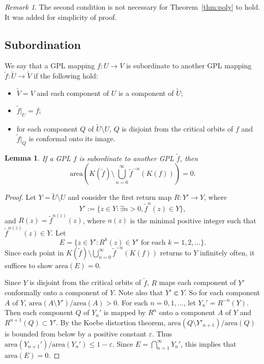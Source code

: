 \documentclass{amsart}
\numberwithin{equation}{section}
\newtheorem{lemma}[theorem]{Lemma}%
\theoremstyle{definition}
\theoremstyle{remark}
\newtheorem{remark}[theorem]{Remark}%
\begin{document}
\begin{remark} The second condition is not necessary for Theorem~\ref{thm:poly} to hold. It was added for simplicity of proof. 
\end{remark}




\subsection{Subordination}\label{subsec:subord}
We say that a GPL mapping $f:U\to V$ is subordinate to another GPL mapping $\widetilde{f}:\widetilde{U}\to \widetilde{V}$ if the following hold:
\begin{itemize}
\item $\widetilde{V}=V$ and each component of $U$ is a component of $\widetilde{U}$; 
\item $\widetilde{f}|_U=f$;
\item for each component $Q$ of $\widetilde{U}\setminus U$, $Q$ is disjoint from the critical orbits of $f$ and $\widetilde{f}|_Q$ is conformal onto its image. 
\end{itemize}


\begin{lemma}\label{lem:subordJulia} If a GPL $f$ is subordinate to another GPL $\widetilde{f}$, then 
$$\text{area}\left(K(\widetilde{f})\setminus\bigcup_{n=0}^\infty \widetilde{f}^{-n}(K(f))\right)=0.$$
\end{lemma}
\begin{proof} Let $Y=\widetilde{U}\setminus U$ and consider the first return map $R:Y'\to Y$, where  
$$Y':=\{z\in Y: \exists n>0, \widetilde{f}^n(z)\in Y\},$$ and 
$R(z)=\widetilde{f}^{n(z)}(z)$, where $n(z)$ is the minimal positive integer such that $\widetilde{f}^{n(z)}(z)\in Y$. Let $$E=\{z\in Y': R^k(z)\in Y' \text{ for each } k=1,2,\dots\}.$$
Since each point in 
$K(\widetilde{f})\setminus\bigcup_{n=0}^\infty \widetilde{f}^{-n}(K(f))$ returns to $Y$ infinitely often, it suffices to show $\text{area}(E)=0$.

Since $Y$ is disjoint from the critical orbits of $\widetilde{f}$, $R$ maps each component of $Y'$ conformally onto a component of $Y$. Note also that $Y'\Subset Y$. So for each component $A$ of $Y$, $\text{area}(A\setminus Y')/\text{area}(A)>0$. For each $n=0,1,\ldots$, let $Y_n'=R^{-n}(Y)$. Then each component $Q$ of $Y_n'$ is mapped by $R^n$ onto a component $A$ of $Y$ and $R^{n+1}(Q)\subset Y'$. By the Koebe distortion theorem, $\text{area}(Q\setminus Y'_{n+1})/\text{area}(Q)$ is bounded from below by a positive constant $\varepsilon$. 
Thus $\text{area}(Y_{n+1}')/\text{area}(Y_n')\le 1-\varepsilon$. 
Since $E=\bigcap_{n=1}^\infty Y_n'$, this implies that $\text{area}(E)=0$. 
\end{proof}
\end{document}
